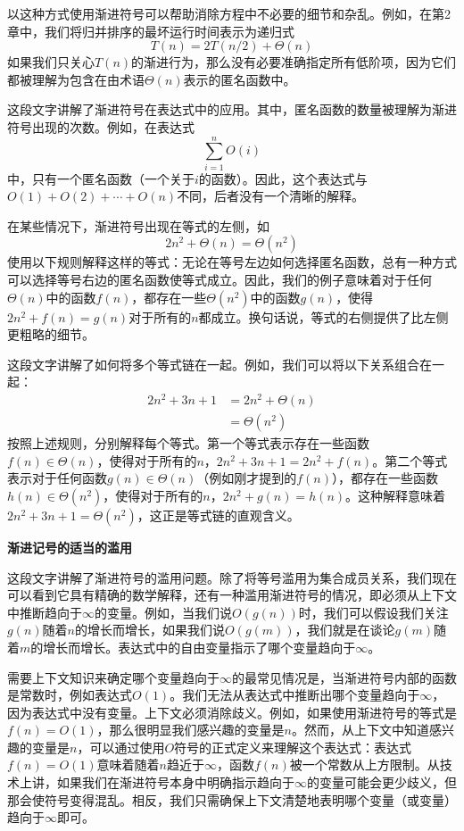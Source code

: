 \documentclass[lang=cn,newtx,10pt,scheme=chinese]{elegantbook}
\begin{document}
以这种方式使用渐进符号可以帮助消除方程中不必要的细节和杂乱。例如，在第2章中，我们将归并排序的最坏运行时间表示为递归式
$$
T(n)=2 T(n / 2)+\Theta(n)
$$
如果我们只关心$T(n)$的渐进行为，那么没有必要准确指定所有低阶项，因为它们都被理解为包含在由术语$\Theta(n)$表示的匿名函数中。

这段文字讲解了渐进符号在表达式中的应用。其中，匿名函数的数量被理解为渐进符号出现的次数。例如，在表达式$$\sum_{i=1}^n O(i)$$中，只有一个匿名函数（一个关于$i$的函数）。因此，这个表达式与$O(1)+O(2)+\cdots+O(n)$不同，后者没有一个清晰的解释。

在某些情况下，渐进符号出现在等式的左侧，如$$2 n^2+\Theta(n)=\Theta\left(n^2\right)$$使用以下规则解释这样的等式：无论在等号左边如何选择匿名函数，总有一种方式可以选择等号右边的匿名函数使等式成立。因此，我们的例子意味着对于任何$\Theta(n)$中的函数$f(n)$，都存在一些$\Theta\left(n^2\right)$中的函数$g(n)$，使得$2 n^2+f(n)=g(n)$对于所有的$n$都成立。换句话说，等式的右侧提供了比左侧更粗略的细节。

这段文字讲解了如何将多个等式链在一起。例如，我们可以将以下关系组合在一起：
$$
\begin{aligned}
2 n^2+3 n+1 & =2 n^2+\Theta(n) \\
& =\Theta\left(n^2\right)
\end{aligned}
$$
按照上述规则，分别解释每个等式。第一个等式表示存在一些函数$f(n) \in \Theta(n)$，使得对于所有的$n$，$2 n^2+3 n+1=2 n^2+f(n)$。第二个等式表示对于任何函数$g(n) \in \Theta(n)$（例如刚才提到的$f(n)$），都存在一些函数$h(n) \in \Theta\left(n^2\right)$，使得对于所有的$n$，$2 n^2+g(n)=h(n)$。这种解释意味着$2 n^2+3 n+1=\Theta\left(n^2\right)$，这正是等式链的直观含义。

\textbf{渐进记号的适当的滥用}

这段文字讲解了渐进符号的滥用问题。除了将等号滥用为集合成员关系，我们现在可以看到它具有精确的数学解释，还有一种滥用渐进符号的情况，即必须从上下文中推断趋向于$\infty$的变量。例如，当我们说$O(g(n))$时，我们可以假设我们关注$g(n)$随着$n$的增长而增长，如果我们说$O(g(m))$，我们就是在谈论$g(m)$随着$m$的增长而增长。表达式中的自由变量指示了哪个变量趋向于$\infty$。

需要上下文知识来确定哪个变量趋向于$\infty$的最常见情况是，当渐进符号内部的函数是常数时，例如表达式$O(1)$。我们无法从表达式中推断出哪个变量趋向于$\infty$，因为表达式中没有变量。上下文必须消除歧义。例如，如果使用渐进符号的等式是$f(n)=O(1)$，那么很明显我们感兴趣的变量是$n$。然而，从上下文中知道感兴趣的变量是$n$，可以通过使用$O$符号的正式定义来理解这个表达式：表达式$f(n)=O(1)$意味着随着$n$趋近于$\infty$，函数$f(n)$被一个常数从上方限制。从技术上讲，如果我们在渐进符号本身中明确指示趋向于$\infty$的变量可能会更少歧义，但那会使符号变得混乱。相反，我们只需确保上下文清楚地表明哪个变量（或变量）趋向于$\infty$即可。
\end{document}
